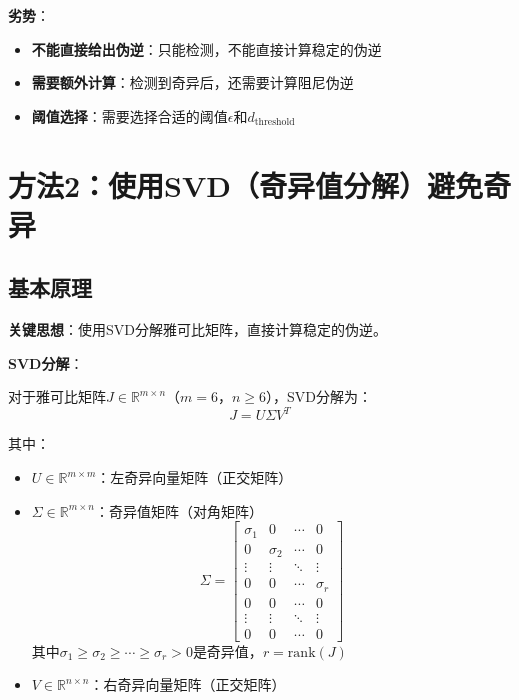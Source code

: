 \documentclass[12pt,a4paper]{article}
\begin{document}
\textbf{劣势}：
\begin{itemize}
\item \textbf{不能直接给出伪逆}：只能检测，不能直接计算稳定的伪逆
\item \textbf{需要额外计算}：检测到奇异后，还需要计算阻尼伪逆
\item \textbf{阈值选择}：需要选择合适的阈值$\epsilon$和$d_{\text{threshold}}$
\end{itemize}

\section{方法2：使用SVD（奇异值分解）避免奇异}

\subsection{基本原理}

\textbf{关键思想}：使用SVD分解雅可比矩阵，直接计算稳定的伪逆。

\textbf{SVD分解}：

对于雅可比矩阵$J \in \mathbb{R}^{m \times n}$（$m = 6$，$n \geq 6$），SVD分解为：
\begin{equation}
J = U\Sigma V^T
\end{equation}

其中：
\begin{itemize}
\item $U \in \mathbb{R}^{m \times m}$：左奇异向量矩阵（正交矩阵）
\item $\Sigma \in \mathbb{R}^{m \times n}$：奇异值矩阵（对角矩阵）
\begin{equation}
\Sigma = \begin{bmatrix}
\sigma_1 & 0 & \cdots & 0 \\
0 & \sigma_2 & \cdots & 0 \\
\vdots & \vdots & \ddots & \vdots \\
0 & 0 & \cdots & \sigma_r \\
0 & 0 & \cdots & 0 \\
\vdots & \vdots & \ddots & \vdots \\
0 & 0 & \cdots & 0
\end{bmatrix}
\end{equation}
其中$\sigma_1 \geq \sigma_2 \geq \cdots \geq \sigma_r > 0$是奇异值，$r = \text{rank}(J)$
\item $V \in \mathbb{R}^{n \times n}$：右奇异向量矩阵（正交矩阵）
\end{itemize}
\end{document}
